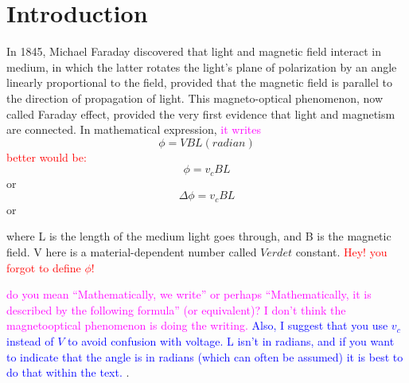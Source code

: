\documentclass[prb,preprint]{revtex4-1}
\begin{document}
\section{Introduction} 

In 1845, Michael Faraday discovered that light and magnetic field interact in medium, in which the latter rotates the light's plane of polarization by an angle linearly proportional to the field, provided that the magnetic field is parallel to the direction of propagation of light. This magneto-optical phenomenon, now called Faraday effect, provided the very first evidence that light and magnetism are connected. In mathematical expression, \textcolor{magenta}{it writes}
\begin{equation}
\label{faraday}
\phi =VBL  (radian)
\end{equation}
\textcolor{red}{better would be:}
\begin{equation*}
\label{faraday}
\phi =v_cBL 
\end{equation*}
or
\begin{equation*}
\label{faraday}
\Delta\phi =v_cBL 
\end{equation*}
or

where L is the length of the medium light goes through, and B is the magnetic field. V here is a material-dependent number called $Verdet$ constant. 
\textcolor{red}{Hey! you forgot to define $\phi$!}

\textcolor{magenta}{do you mean ``Mathematically, we write'' or perhaps ``Mathematically, it is described by the following formula'' (or equivalent)? I don't think the magnetooptical phenomenon is doing the writing.} \textcolor{blue}{Also, I suggest that you use $v_c$ instead of $V$ to avoid confusion with voltage. L isn't in radians, and if you want to indicate that the angle is in radians (which can often be assumed) it is best to do that within the text. }. 
\end{document}
